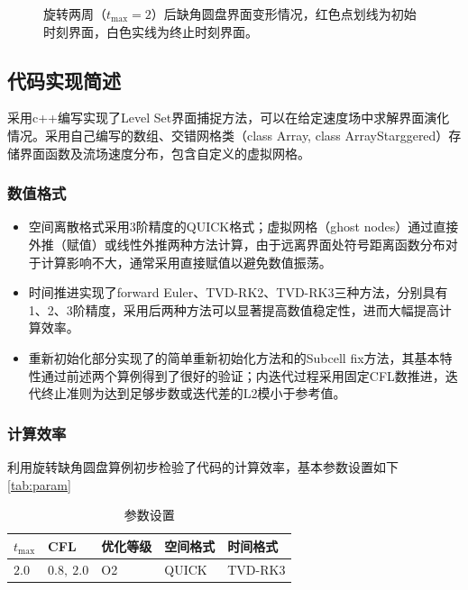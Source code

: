 \documentclass[11pt]{article}
\begin{document}
\begin{figure}[p]
    \caption{\label{fig:rotation}旋转两周（$t_\mathrm{max}=2$）后缺角圆盘界面变形情况，红色点划线为初始时刻界面，白色实线为终止时刻界面。}
\end{figure}

\subsection{代码实现简述}
采用c++编写实现了Level Set界面捕捉方法，可以在给定速度场中求解界面演化情况。采用自己编写的数组、交错网格类（class Array, class ArrayStarggered）存储界面函数及流场速度分布，包含自定义的虚拟网格。
\subsubsection{数值格式}
\begin{itemize}
    \item 空间离散格式采用3阶精度的QUICK格式；虚拟网格（ghost nodes）通过直接外推（赋值）或线性外推两种方法计算，由于远离界面处符号距离函数分布对于计算影响不大，通常采用直接赋值以避免数值振荡。
    \item 时间推进实现了forward Euler、TVD-RK2、TVD-RK3三种方法，分别具有1、2、3阶精度，采用后两种方法可以显著提高数值稳定性，进而大幅提高计算效率。
    \item 重新初始化部分实现了\citet{sussman_level_1994}的简单重新初始化方法和\citet{russo_remark_2000}的Subcell fix方法，其基本特性通过前述两个算例得到了很好的验证；内迭代过程采用固定CFL数推进，迭代终止准则为达到足够步数或迭代差的L2模小于参考值。
\end{itemize}

\subsubsection{计算效率}
利用旋转缺角圆盘算例初步检验了代码的计算效率，基本参数设置如下\autoref{tab:param}  
\begin{table}[h]
    \centering
    \caption{\label{tab:param}参数设置}
    \begin{tabular}{lllll}
        \toprule
        $t_\mathrm{max}$ & CFL         & 优化等级 & 空间格式 & 时间格式 \\
        \midrule
        $2.0$            & $0.8,\ 2.0$ & O2       & QUICK    & TVD-RK3  \\
        \bottomrule
    \end{tabular}
\end{table}
\end{document}
